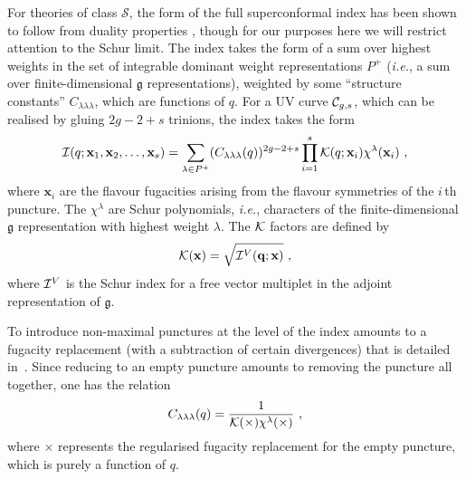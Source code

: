 \documentclass[a4paper]{article}
\def\CC{{\cal C}}
\def\II{{\cal I}}
\def\KK{{\cal K}}
\def\gf{\mathfrak{g}}
\def \ie{{\it i.e.}}
\begin{document}
For theories of class $\mathcal{S}$, the form of the full superconformal index has been shown to follow from duality properties \cite{Gaiotto:2012xa}, though for our purposes here we will restrict attention to the Schur limit. The index takes the form of a sum over highest weights in the set of integrable dominant weight representations $P^+$ (\ie, a sum over finite-dimensional $\gf$ representations), weighted by some ``structure constants'' $C_{\lambda\lambda\lambda}$, which are functions of $q$. For a UV curve $\CC_{g,s}$, which can be realised by gluing $2g-2+s$ trinions, the index takes the form~\cite{Aganagic:2005, Gadde:20102d, Gadde:2011uv, Alday:2013kda}
\begin{equation}
\label{eq:indfull}
	\II(q;\mathbf{x}_1,\mathbf{x}_2,\dots,\mathbf{x}_s) = \sum_{\lambda\in P^+}(C_{\lambda\lambda\lambda}(q))^{2g-2+s}\prod_{i=1}^s \KK(q;\mathbf{x}_i)\chi^\lambda(\mathbf{x}_i)~,
\end{equation}
where $\mathbf{x}_i$ are the flavour fugacities arising from the flavour symmetries of the $i\,$th puncture. The $\chi^\lambda$ are Schur polynomials, \ie, characters of the finite-dimensional $\gf$ representation with highest weight $\lambda$. The $\KK$ factors are defined by
\begin{equation}
	\KK(\mathbf{x}) = \sqrt{\II^V(\mathbf{q;x})}~,
\end{equation}
where $\II^V$ is the Schur index for a free vector multiplet in the adjoint representation of $\gf$.

To introduce non-maximal punctures at the level of the index amounts to a fugacity replacement (with a subtraction of certain divergences) that is detailed in~\cite{Gadde:2011uv,Rastelli:2014jja,Beem:2014rza}. Since reducing to an empty puncture amounts to removing the puncture all together, one has the relation
\begin{equation}
	C_{\lambda\lambda\lambda}(q) = \frac{1}{\KK(\times) \chi^\lambda(\times)}~,
\end{equation}
where $\times$ represents the regularised fugacity replacement for the empty puncture, which is purely a function of $q$.
\end{document}
